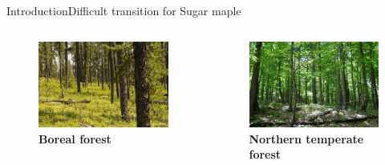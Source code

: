 \documentclass[table]{eecslides}
\begin{document}
\begin{frame}[t]{Introduction}{Difficult transition for Sugar maple}
\vspace{-1.5em}
\begin{columns}[c]
	\begin{column}{.40\paperwidth}
		\begin{figure}
			\caption*{\textbf{Boreal forest}}
			\vspace{-0.5em}
			\includegraphics[width=.30\paperwidth]{Figs/bor_forest.jpg}
		\end{figure}
	\end{column}
	\begin{column}{.40\paperwidth}
		\begin{figure}
			\caption*{\textbf{Northern temperate forest}}
			\vspace{-0.5em}
			\includegraphics[width=.30\paperwidth]{Figs/temp_forest2.jpg}
		\end{figure}

\end{column}
\end{columns}
\end{frame}
\end{document}
